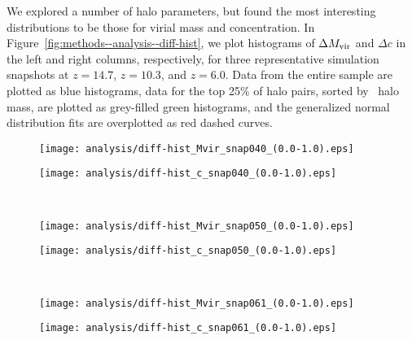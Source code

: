 We explored a number of halo parameters, but found the most interesting distributions to be those for virial mass and concentration.  In Figure~\ref{fig:methods--analysis--diff-hist}, we plot histograms of $\Delta {M_{\mathrm{vir}}}$ and $\Delta c$ in the left and right columns, respectively, for three representative simulation snapshots at $z = 14.7$, $z = 10.3$, and $z = 6.0$.  Data from the entire sample are plotted as blue histograms, data for the top 25\% of halo pairs, sorted by \lpt\ halo mass, are plotted as grey-filled green histograms, and the generalized normal distribution fits are overplotted as red dashed curves.

\begin{figure*}[tp]
	\centering
	\begin{subfigure}{}
		\texttt{[image: analysis/diff-hist\_Mvir\_snap040\_(0.0-1.0).eps]}
	\end{subfigure}
	\begin{subfigure}{}
		\texttt{[image: analysis/diff-hist\_c\_snap040\_(0.0-1.0).eps]}
	\end{subfigure}
	\\
	\begin{subfigure}{}
		\texttt{[image: analysis/diff-hist\_Mvir\_snap050\_(0.0-1.0).eps]}
	\end{subfigure}
	\begin{subfigure}{}
		\texttt{[image: analysis/diff-hist\_c\_snap050\_(0.0-1.0).eps]}
	\end{subfigure}
	\\
	\begin{subfigure}{}
		\texttt{[image: analysis/diff-hist\_Mvir\_snap061\_(0.0-1.0).eps]}
	\end{subfigure}
	\begin{subfigure}{}
		\texttt{[image: analysis/diff-hist\_c\_snap061\_(0.0-1.0).eps]}
	\end{subfigure}
	\caption[Histograms of $\Delta M_{\mathrm{vir}}$ and $\Delta c$]{\footnotesize Histograms of $\Delta M_{\mathrm{vir}}$ (\textit{left column}) and $\Delta c$ (\textit{right column}) for snapshots at $z = 14.7$, $z = 10.3$, and $z = 6.0$ (\textit{top, middle, and bottom panels, respectively}).  The small gray-filled histograms count only the top 25\% most massive halos.  The main histograms are fit with a generalized normal distribution with parameters for mean, scale, and shape, overplotted as the red dashed line (see Equation~\ref{eq:analysis--generalized_normal}).}
	\label{fig:methods--analysis--diff-hist}
\end{figure*}




